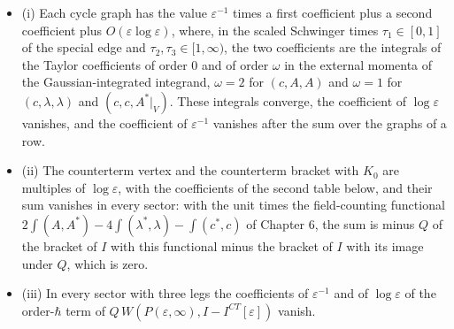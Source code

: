\begin{theorem}
\label{thm:c9-sing}
\begin{itemize}
\item (i) Each cycle graph has the value $\varepsilon^{-1}$ times a first coefficient plus a second coefficient plus $O(\varepsilon\log\varepsilon)$, where, in the scaled Schwinger times $\tau_1\in[0,1]$ of the special edge and $\tau_2,\tau_3\in[1,\infty)$, the two coefficients are the integrals of the Taylor coefficients of order $0$ and of order $\omega$ in the external momenta of the Gaussian-integrated integrand, $\omega=2$ for $(c,A,A)$ and $\omega=1$ for $(c,\lambda,\lambda)$ and $(c,c,A^*|_V)$. These integrals converge, the coefficient of $\log\varepsilon$ vanishes, and the coefficient of $\varepsilon^{-1}$ vanishes after the sum over the graphs of a row.
\item (ii) The counterterm vertex and the counterterm bracket with $K_0$ are multiples of $\log\varepsilon$, with the coefficients of the second table below, and their sum vanishes in every sector: with the unit times the field-counting functional $2\int(A,A^*)-4\int(\lambda^*,\lambda)-\int(c^*,c)$ of Chapter 6, the sum is minus $Q$ of the bracket of $I$ with this functional minus the bracket of $I$ with its image under $Q$, which is zero.
\item (iii) In every sector with three legs the coefficients of $\varepsilon^{-1}$ and of $\log\varepsilon$ of the order-$\hbar$ term of $Q\,W(P(\varepsilon,\infty),I-I^{CT}[\varepsilon])$ vanish.
\end{itemize}
\end{theorem}

